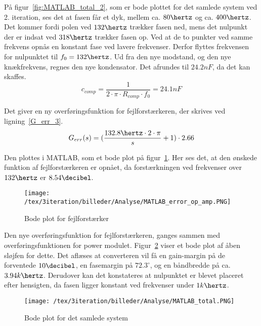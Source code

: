 På figur~\ref{fig:MATLAB_total_2}, som er bode plottet for det samlede system ved 2. iteration, ses det at fasen får et dyk, mellem ca. $80\hertz$ og ca. $400\hertz$. Det kommer fordi polen ved $132\hertz$ trækker fasen ned, mens det nulpunkt der er indsat ved $318\hertz$ trækker fasen op. Ved at de to punkter ved samme frekvens opnås en konstant fase ved lavere frekvenser. Derfor flyttes frekvensen for nulpunktet til $f_0=132\hertz$. Ud fra den nye modstand, og den nye knækfrekvens, regnes den nye kondensator. Det afrundes til $24.2nF$, da det kan skaffes.
\begin{equation} \label{c_comp_3}
c_{comp} = \frac{1}{2\cdot \pi \cdot R_{comp} \cdot f_0} = 24.1nF
\end{equation}

\noindent Det giver en ny overføringsfunktion for fejlforstærkeren, der skrives ved ligning~\ref{G_err_3}. 
\begin{equation} \label{G_err_3}
G_{err}(s) = (\frac{132.8\hertz \cdot 2\cdot\pi}{s} + 1) \cdot 2.66
\end{equation}

Den plottes i MATLAB, som et bode plot på figur~\ref{fig:MATLAB_error_op_amp_3}. Her ses det, at den ønskede funktion af fejlforstærkeren er opnået, da forstærkningen ved frekvenser over $132\hertz$ er $8.54\decibel$. 

\begin{figure}[H]
	\center
	\texttt{[image: /tex/3iteration/billeder/Analyse/MATLAB\_error\_op\_amp.PNG]}
	\caption{Bode plot for fejlforstærker}
	\label{fig:MATLAB_error_op_amp_3}
\end{figure}

Den nye overføringsfunktion for fejlforstærkeren, ganges sammen med overføringsfunktionen for power modulet. Figur~\ref{fig:MATLAB_total_3} viser et bode plot af åben sløjfen for dette. Det aflæses at converteren vil få en gain-margin på de forventede $10\decibel$, en fasemargin på $72.3^\circ$, og en båndbredde på ca. $3.94k\hertz$. Derudover kan det konstateres at nulpunktet er blevet placeret efter hensigten, da fasen ligger konstant ved frekvenser under $1k\hertz$. 

\begin{figure}[H]
	\center
	\texttt{[image: /tex/3iteration/billeder/Analyse/MATLAB\_total.PNG]}
	\caption{Bode plot for det samlede system}
	\label{fig:MATLAB_total_3}
\end{figure}







